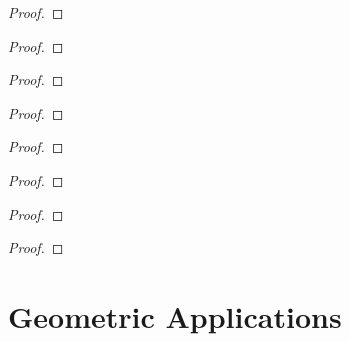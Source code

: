 \begin{exercise}
\end{exercise}

\begin{proof}
\end{proof}

\begin{exercise}
\end{exercise}

\begin{proof}
\end{proof}

\begin{exercise}
\end{exercise}

\begin{proof}
\end{proof}

\begin{exercise}
\end{exercise}

\begin{proof}
\end{proof}

\begin{exercise}
\end{exercise}

\begin{proof}
\end{proof}

\begin{exercise}
\end{exercise}

\begin{proof}
\end{proof}

\begin{exercise}
\end{exercise}

\begin{proof}
\end{proof}

\begin{exercise}
\end{exercise}

\begin{proof}
\end{proof}

\section{Geometric Applications}
\setcounter{exercise}{0}

